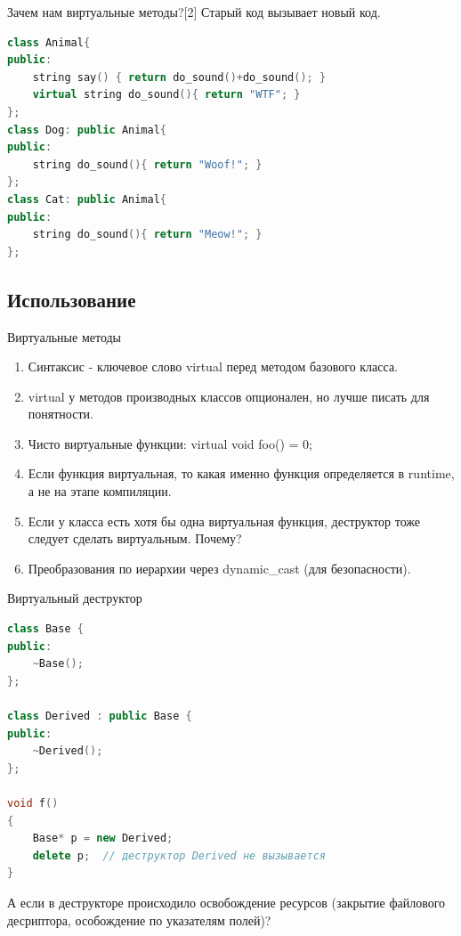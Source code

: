 \documentclass[10pt]{beamer}
\begin{document}
\begin{frame}[fragile]{Зачем нам виртуальные методы?[2]}
Старый код вызывает новый код.
\begin{lstlisting}[language=C++]
class Animal{
public:
    string say() { return do_sound()+do_sound(); }
    virtual string do_sound(){ return "WTF"; }
};
class Dog: public Animal{
public:
    string do_sound(){ return "Woof!"; }
};
class Cat: public Animal{
public:
    string do_sound(){ return "Meow!"; }
};

\end{lstlisting}
\end{frame}

\subsection{Использование}
\begin{frame}[fragile]{Виртуальные методы}
\begin{enumerate}
    \item Синтаксис - ключевое слово virtual перед методом базового класса.
    \item virtual у методов производных классов опционален, но лучше писать для понятности.
    \item Чисто виртуальные функции: virtual void foo() = 0;
    \item Если функция виртуальная, то какая именно функция определяется в runtime, а не на этапе компиляции.
    \item Если у класса есть хотя бы одна виртуальная функция, деструктор тоже следует сделать виртуальным. Почему?
    \item Преобразования по иерархии через dynamic\_cast (для безопасности).
\end{enumerate}
\end{frame}


\begin{frame}[fragile]{Виртуальный деструктор}
\begin{lstlisting}[language=C++]
class Base {
public:
    ~Base();
};

class Derived : public Base {
public:
    ~Derived();
};

void f()
{
    Base* p = new Derived;
    delete p;  // деструктор Derived не вызывается
}
\end{lstlisting}
А если в деструкторе происходило освобождение ресурсов (закрытие файлового десриптора, особождение по указателям полей)?
\end{frame}
\end{document}
